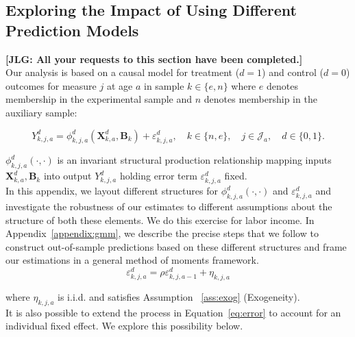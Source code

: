 \subsection{Exploring the Impact of Using Different Prediction Models} \label{appendix:predsensitivity}
\noindent \textbf{[JLG: All your requests to this section have been completed.]}\\

\noindent Our analysis is based on a causal model for treatment ($d=1$) and control ($d=0$) outcomes for measure $j$ at age $a$ in sample $k \in \{e,n\}$ where $e$ denotes membership in the experimental sample and $n$ denotes membership in the auxiliary sample:

\begin{equation}\label{eq:outcome}
Y^d_{k,j,a} = \phi^d_{k,j,a} (\bm{X}^d_{k,a}, \bm{B}_k) + \varepsilon^d_{k,j,a}, \quad k \in \{n,e\}, \quad j \in \mathcal{J}_a, \quad d \in \{0, 1\}.
\end{equation}

\noindent $\phi^d_{k,j,a}\left( \cdot, \cdot \right)$ is an invariant structural production relationship mapping inputs $\bm{X}^d_{k,a}, \bm{B}_k$ into output $Y^d_{k,j,a}$ holding error term $\varepsilon^d_{k,j,a}$ fixed.\\ 

\noindent In this appendix, we layout different structures for $\phi_{k,j,a}^d \left( \cdot, \cdot \right)$ and $\varepsilon_{k,j,a}^d$ and investigate the robustness of our estimates to different assumptions about the structure of both these elements. We do this exercise for labor income. In Appendix~\ref{appendix:gmm}, we describe the precise steps that we follow to construct out-of-sample predictions based on these different structures and frame our estimations in a general method of moments framework.\\ 

\begin{equation}
\varepsilon^d_{k,j,a} = \rho \varepsilon^d_{k,j,{a-1}} + \eta_{k,j,{a}} \label{eq:error}
\end{equation}

\noindent where $\eta_{k,j,{a}}$ is i.i.d. and satisfies Assumption ~\ref{ass:exog} (Exogeneity).\\

\noindent It is also possible to extend the process in Equation~\eqref{eq:error} to account for an individual fixed effect. We explore this possibility below.\\ 

